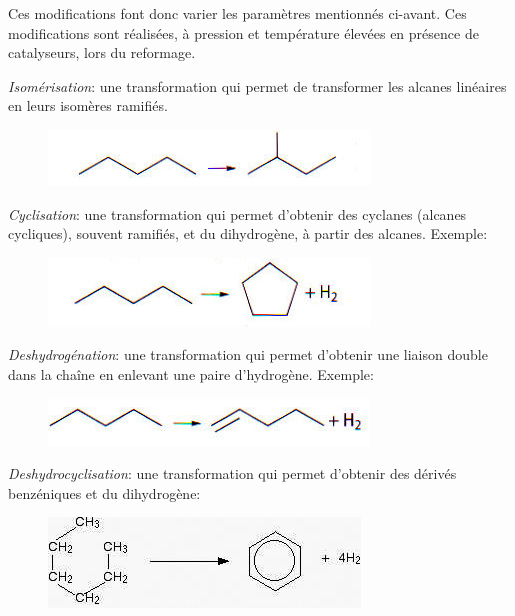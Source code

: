 \documentclass[11pt,a4paper]{article}
\begin{document}
Ces modifications font donc varier les paramètres mentionnés ci-avant. Ces modifications sont réalisées, à pression et température élevées en présence de catalyseurs, lors du reformage.

\textit{Isomérisation}: une transformation qui permet de transformer les alcanes linéaires en leurs isomères ramifiés. 
 \begin{figure}[H]
    \centering
    \includegraphics[width=0.65\linewidth]{imgs/c5/isomerisation.jpg}
\end{figure}

\textit{Cyclisation}: une transformation qui permet d’obtenir des cyclanes (alcanes cycliques), souvent ramifiés, et du dihydrogène, à partir des alcanes. Exemple: 

 \begin{figure}[H]
    \centering
    \includegraphics[width=0.65\linewidth]{imgs/c5/cyclisation.jpg}
\end{figure}

\textit{Deshydrogénation}: une transformation qui permet d’obtenir une liaison double dans la chaîne en enlevant une paire d’hydrogène. Exemple: 

\begin{figure}[H]
    \centering
    \includegraphics[width=0.65\linewidth]{imgs/c5/deshydrogen.jpg}
\end{figure} 

\textit{Deshydrocyclisation}: une transformation qui permet d’obtenir des dérivés benzéniques et du dihydrogène: 
	
\begin{figure}[H]
    \centering
    \includegraphics[width=0.7\linewidth]{imgs/c5/deshydrocycle.jpg}
\end{figure}
\end{document}
